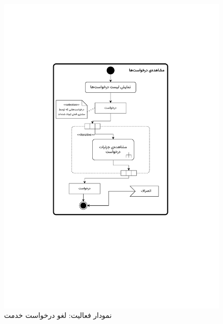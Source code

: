 \begin{figure}[ht!]
	\centering
	\includegraphics[scale=0.8, page=7]{figs/OOD-activity11-20.pdf}
	\caption{نمودار فعالیت: لغو درخواست خدمت}
\end{figure}
\FloatBarrier
\newpage

